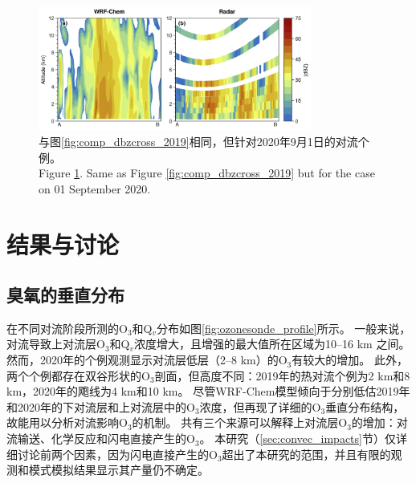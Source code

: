 \begin{figure}[!htbp]
\centering
\includegraphics[width=0.8\textwidth]{./figures/comp_dbzcross_2019.png}
\caption{与图\ref{fig:comp_dbzcross_2019}相同，但针对2020年9月1日的对流个例。\\
Figure \ref{fig:comp_dbzcross_2020}. Same as Figure \ref{fig:comp_dbzcross_2019} but for the case on 01 September 2020.}
\label{fig:comp_dbzcross_2020}
\end{figure}



\section{结果与讨论}

\subsection{臭氧的垂直分布} \label{sec:o3_profile}

在不同对流阶段所测的O$_3$和Q$_v$分布如图\ref{fig:ozonesonde_profile}所示。
一般来说，对流导致上对流层O$_3$和Q$_v$浓度增大，且增强的最大值所在区域为10--16 km 之间。
然而，2020年的个例观测显示对流层低层（2--8 km）的O$_3$有较大的增加。
此外，两个个例都存在双谷形状的O$_3$剖面，但高度不同：2019年的热对流个例为2 km和8 km，2020年的飑线为4 km和10 km。
尽管WRF-Chem模型倾向于分别低估2019年和2020年的下对流层和上对流层中的O$_3$浓度，但再现了详细的O$_3$垂直分布结构，故能用以分析对流影响O$_3$的机制。
共有三个来源可以解释上对流层O$_3$的增加：对流输送、化学反应和闪电直接产生的O$_3$。
本研究（\ref{sec:convec_impacts}节）仅详细讨论前两个因素，因为闪电直接产生的O$_3$超出了本研究的范围，并且有限的观测和模式模拟结果显示其产量仍不确定\citep{Morris.2010,Ripoll.2014}。



